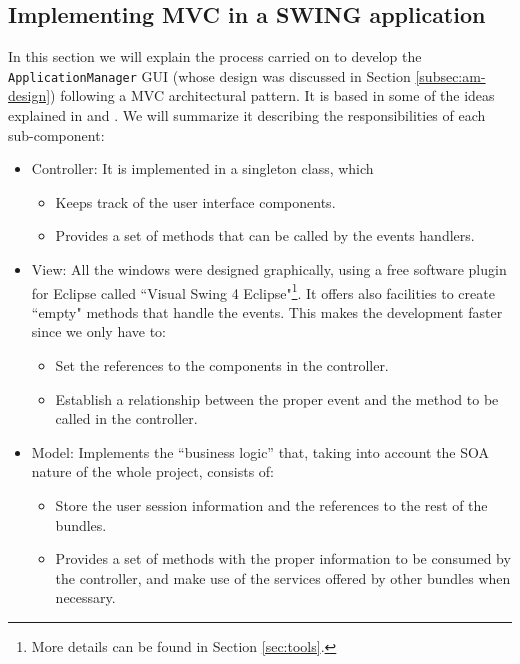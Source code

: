 \subsection{Implementing MVC in a SWING application}
\label{subsec:implementation-mvc-swing}
In this section we will explain the process carried on to develop the
\verb|ApplicationManager| GUI (whose design was discussed in Section
\ref{subsec:am-design}) following a MVC architectural pattern.
\newline
It is based in some of the ideas explained in \cite{mvc-java} and
\cite{interfaces05}.
\newline
We will summarize it describing the responsibilities of each sub-component:
\begin{itemize}
  \item Controller: It is implemented in a singleton class, which
  	\begin{itemize}
	  \item Keeps track of the user interface components.
	  \item Provides a set of methods that can be called by the events handlers. 
	\end{itemize}
  \item View: All the windows were designed graphically, using a free software
	  plugin for Eclipse called ``Visual Swing 4 Eclipse"\footnote{More details can
	  be found in Section \ref{sec:tools}.}. It offers also facilities to create ``empty"
	  methods that handle the events. This makes the development faster since we
	  only have to:
  	\begin{itemize}
        \item Set the references to the components in the controller.
        \item Establish a relationship between the proper event and the method
        to be called in the controller.
     \end{itemize}
  \item Model: Implements the ``business logic'' that, taking into account the
  SOA nature of the whole project, consists of:
  	\begin{itemize}
        \item Store the user session information and the references to the rest
        of the bundles.
        \item Provides a set of methods with the proper information to be
        consumed by the controller, and make use of the services offered by
        other bundles when necessary.
     \end{itemize}

\end{itemize}

